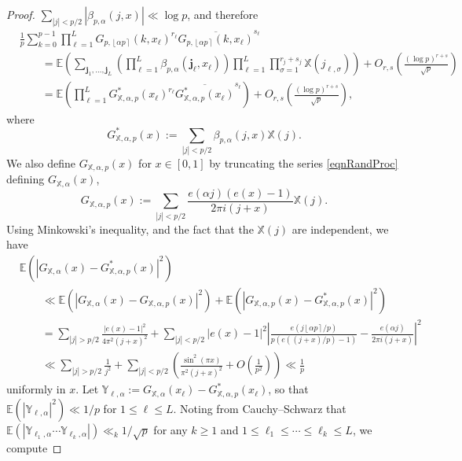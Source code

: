 \documentclass[reqno]{amsart}
\numberwithin{equation}{section}
\numberwithin{table}{section}
\numberwithin{figure}{section}
\newcommand{\abs}[1]{\left\lvert#1\right\rvert}
\newcommand{\round}[1]{\left\lfloor#1\right\rceil}
\begin{document}
\begin{proof}
 $\sum_{\abs{j}<p/2} \abs{\beta_{p,\alpha}(j,x)} \ll \log p$, and therefore
\begin{equation}\label{eqnMoments}
\begin{split}
&\frac{1}{p}\sum_{k=0}^{p-1} \prod_{\ell=1}^L G_{p,\round{\alpha p}}(k, x_\ell)^{r_\ell} \overline{G_{p,\round{\alpha p}}(k, x_\ell)}^{s_\ell}\\
&\qquad =
\mathbb{E}\left(\sum_{\mathbf{j}_1,\ldots,\mathbf{j}_L} \left(\prod_{\ell=1}^L \beta_{p,\alpha}(\mathbf{j}_\ell, x_\ell)\right) \prod_{\ell=1}^L \prod_{\sigma=1}^{r_j+s_j} \mathbb{X}(j_{\ell,\sigma}) \right) + O_{r,s}\left(\frac{(\log p)^{r+s}}{\sqrt{p}}\right)\\
&\qquad =
\mathbb{E}\left(\prod_{\ell=1}^L G^*_{\mathbb{X},\alpha,p}(x_\ell)^{r_\ell} \overline{G^*_{\mathbb{X},\alpha,p}(x_\ell)}^{s_\ell}\right)  + O_{r,s}\left(\frac{(\log p)^{r+s}}{\sqrt{p}}\right),
\end{split}
\end{equation}
where
\[
G^*_{\mathbb{X},\alpha,p}(x) := \sum_{\abs{j}<p/2} \beta_{p,\alpha}(j,x) \mathbb{X}(j).
\]
We also define $G_{\mathbb{X},\alpha,p}(x)$ for $x\in[0,1]$ by truncating the series \eqref{eqnRandProc} defining $G_{\mathbb{X},\alpha}(x)$,
\[
G_{\mathbb{X},\alpha,p}(x) := \sum_{\abs{j}<p/2} \frac{e(\alpha j)(e(x)-1)}{2\pi i (j+x)} \mathbb{X}(j).
\]
Using Minkowski's inequality, and the fact that the $\mathbb{X}(j)$ are independent, we have
\begin{align*}
&\mathbb{E}\left(\abs{G_{\mathbb{X},\alpha}(x) - G^*_{\mathbb{X},\alpha,p}(x)}^2\right)\\
&\qquad \ll
\mathbb{E}\left(\abs{G_{\mathbb{X},\alpha}(x) - G_{\mathbb{X},\alpha,p}(x)}^2\right)
+
\mathbb{E}\left(\abs{G_{\mathbb{X},\alpha,p}(x) - G^*_{\mathbb{X},\alpha,p}(x)}^2\right)\\
&\qquad =
\sum_{\abs{j}>p/2} \frac{\abs{e(x)-1}^2}{4\pi^2(j+x)^2}
+
\sum_{\abs{j}<p/2} \abs{e(x)-1}^2 \abs{\frac{e(j\round{\alpha p}/p)}{p(e((j+x)/p)-1)} - \frac{e(\alpha j)}{2\pi i(j+x)}}^2\\
&\qquad \ll
\sum_{\abs{j}>p/2} \frac{1}{j^2} + \sum_{\abs{j}<p/2} \left(\frac{\sin^2(\pi x)}{\pi^2(j+x)^2} + O\left(\frac{1}{p^2}\right)\right) \ll \frac{1}{p}
\end{align*}
uniformly in $x$.
Let $\mathbb{Y}_{\ell,\alpha} := G_{\mathbb{X},\alpha}(x_\ell)-G^*_{\mathbb{X},\alpha,p}(x_\ell)$, so that $\mathbb{E}(\abs{\mathbb{Y}_{\ell,\alpha}}^2) \ll 1/p$ for $1\leq\ell\leq L$.
Noting from Cauchy--Schwarz that $\mathbb{E}(\abs{\mathbb{Y}_{\ell_1,\alpha}\cdots\mathbb{Y}_{\ell_k,\alpha}}) \ll_k 1/\sqrt{p}$ for any $k\geq1$ and $1\leq \ell_1 \leq \cdots \leq \ell_k \leq L$, we compute

\end{proof}
\end{document}
